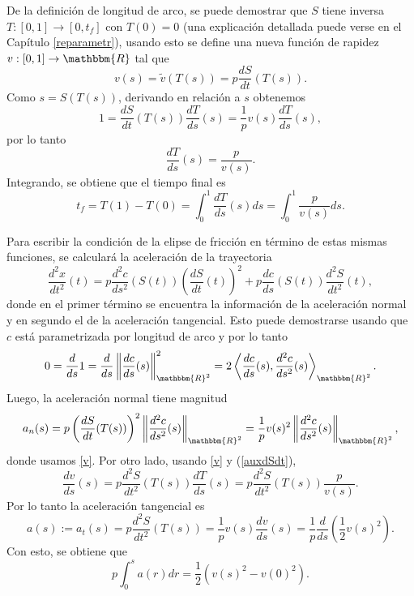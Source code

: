 \documentclass[a4paper,10pt]{book}
\newcommand{\R}{\mathbbm{R}}
\newcommand{\arr}{\rightarrow}
\begin{document}
De la definici\'on de longitud de arco, se puede demostrar que $S$ tiene inversa $T:[0,1]\arr [0,t_f]$ con $T(0)=0$ (una explicación detallada puede verse en el Capítulo \ref{reparametr}), usando esto
se define una nueva funci\'on de rapidez $v:[0,1]\arr\R$ tal que
\begin{equation}\label{v}
v(s)=\tilde v(T(s))=p\frac{dS}{dt}(T(s)). 
\end{equation}
Como $s=S(T(s))$, derivando en relaci\'on a $s$ obtenemos 
\begin{equation}\label{auxdSdt}
1=\frac{dS}{dt}(T(s)) \frac{dT}{ds}(s)= \frac{1}{p} v(s)\frac{dT}{ds}(s), 
\end{equation}
por lo tanto
\[
 \frac{dT}{ds}(s)=\frac{p}{v(s)}.
\]
Integrando, se obtiene que el tiempo final es
\begin{equation}\label{tiempo}
t_f=T(1)-T(0)=\int_{0}^{1} \frac{dT}{ds}(s) ds= \int_{0}^{1} \frac{p}{v(s)}ds.    
\end{equation}


Para escribir la condici\'on de la elipse de fricción en t\'ermino de estas mismas funciones, se calculará la aceleración de la trayectoria
\begin{equation}\label{aceleracion}
\frac{d^2 x}{dt^2}(t)= p\frac{d^2 c}{ds^2}(S(t)) \left(\frac{dS}{dt}(t)\right)^2 + p\frac{dc}{ds}(S(t))\frac{d^2 S}{dt^2}(t),
\end{equation}
donde en el primer t\'ermino se encuentra la informaci\'on de la aceleraci\'on normal y en segundo el de la aceleraci\'on tangencial. Esto puede demostrarse usando que $c$ est\'a parametrizada por longitud de arco y por lo tanto
\[
 0=\frac{d}{ds}1=\frac{d}{ds}\left\| \frac{dc}{ds}(s)\right\|_{\R^2}^2=2 \left\langle\frac{dc}{ds}(s) , \frac{d^2 c}{ds^2}(s)\right\rangle_{\R^2}. 
\]
Luego, la aceleración normal tiene magnitud
\begin{equation}\label{acelnormal}
a_n(s)=p\left(\frac{dS}{dt}(T(s))\right)^2\left\| \frac{d^2 c}{ds^2}(s) \right\|_{\R^2}=\frac{1}{p} v(s)^2\left\| \frac{d^2 c}{ds^2}(s) \right\|_{\R^2},
\end{equation}
donde usamos \eqref{v}. Por otro lado, usando \eqref{v} y (\ref{auxdSdt}),
\[
 \frac{dv}{ds}(s)=p\frac{d^2 S}{dt^2}(T(s))\frac{dT}{ds}(s)=p\frac{d^2 S}{dt^2}(T(s))\frac{p}{v(s)}.
\]
Por lo tanto la aceleración tangencial es
\[
 a(s):=a_t(s)=p\frac{d^2 S}{dt^2}(T(s))=\frac{1}{p} v(s)\frac{d v}{ds}(s)=\frac{1}{p}\frac{d}{ds}\left(\frac{1}{2}v(s)^2\right).
\]
Con esto, se obtiene que
\begin{equation}\label{rel}
p \int_0^s a(r)dr =\frac{1}{2}(v(s)^2-v(0)^2). 
\end{equation}
\end{document}
